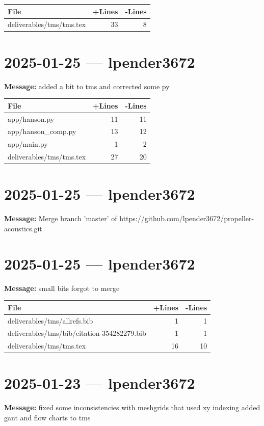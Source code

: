 \documentclass{article}
\begin{document}
\begin{longtable}{|p{10cm}|r|r|}
\hline \textbf{File} & \textbf{+Lines} & \textbf{-Lines} \\
\hline
deliverables/tms/tms.tex & 33 & 8 \\
\hline
\end{longtable}

\section*{2025-01-25 --- lpender3672}
\textbf{Message:} added a bit to tms and corrected some py

\begin{longtable}{|p{10cm}|r|r|}
\hline \textbf{File} & \textbf{+Lines} & \textbf{-Lines} \\
\hline
app/hanson.py & 11 & 11 \\
\hline
app/hanson\_comp.py & 13 & 12 \\
\hline
app/main.py & 1 & 2 \\
\hline
deliverables/tms/tms.tex & 27 & 20 \\
\hline
\end{longtable}

\section*{2025-01-25 --- lpender3672}
\textbf{Message:} Merge branch 'master' of https://github.com/lpender3672/propeller-acoustics.git

\section*{2025-01-25 --- lpender3672}
\textbf{Message:} small bits forgot to merge

\begin{longtable}{|p{10cm}|r|r|}
\hline \textbf{File} & \textbf{+Lines} & \textbf{-Lines} \\
\hline
deliverables/tms/allrefs.bib & 1 & 1 \\
\hline
deliverables/tms/bib/citation-354282279.bib & 1 & 1 \\
\hline
deliverables/tms/tms.tex & 16 & 10 \\
\hline
\end{longtable}

\section*{2025-01-23 --- lpender3672}
\textbf{Message:} fixed some inconsistencies with meshgrids that used xy indexing added gant and flow charts to tms
\end{document}
